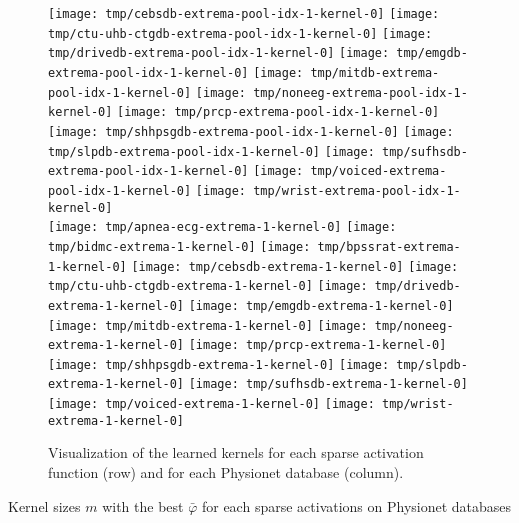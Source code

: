 \documentclass[journal]{IEEEtran}
\begin{document}
\begin{figure*}[!t]
	\texttt{[image: tmp/cebsdb-extrema-pool-idx-1-kernel-0]}
	\texttt{[image: tmp/ctu-uhb-ctgdb-extrema-pool-idx-1-kernel-0]}
	\texttt{[image: tmp/drivedb-extrema-pool-idx-1-kernel-0]}
	\texttt{[image: tmp/emgdb-extrema-pool-idx-1-kernel-0]}
	\texttt{[image: tmp/mitdb-extrema-pool-idx-1-kernel-0]}
	\texttt{[image: tmp/noneeg-extrema-pool-idx-1-kernel-0]}
	\texttt{[image: tmp/prcp-extrema-pool-idx-1-kernel-0]}
	\texttt{[image: tmp/shhpsgdb-extrema-pool-idx-1-kernel-0]}
	\texttt{[image: tmp/slpdb-extrema-pool-idx-1-kernel-0]}
	\texttt{[image: tmp/sufhsdb-extrema-pool-idx-1-kernel-0]}
	\texttt{[image: tmp/voiced-extrema-pool-idx-1-kernel-0]}
	\texttt{[image: tmp/wrist-extrema-pool-idx-1-kernel-0]}
	\\
	\texttt{[image: tmp/apnea-ecg-extrema-1-kernel-0]}
	\texttt{[image: tmp/bidmc-extrema-1-kernel-0]}
	\texttt{[image: tmp/bpssrat-extrema-1-kernel-0]}
	\texttt{[image: tmp/cebsdb-extrema-1-kernel-0]}
	\texttt{[image: tmp/ctu-uhb-ctgdb-extrema-1-kernel-0]}
	\texttt{[image: tmp/drivedb-extrema-1-kernel-0]}
	\texttt{[image: tmp/emgdb-extrema-1-kernel-0]}
	\texttt{[image: tmp/mitdb-extrema-1-kernel-0]}
	\texttt{[image: tmp/noneeg-extrema-1-kernel-0]}
	\texttt{[image: tmp/prcp-extrema-1-kernel-0]}
	\texttt{[image: tmp/shhpsgdb-extrema-1-kernel-0]}
	\texttt{[image: tmp/slpdb-extrema-1-kernel-0]}
	\texttt{[image: tmp/sufhsdb-extrema-1-kernel-0]}
	\texttt{[image: tmp/voiced-extrema-1-kernel-0]}
	\texttt{[image: tmp/wrist-extrema-1-kernel-0]}
	\caption{Visualization of the learned kernels for each sparse activation function (row) and for each Physionet database (column).
	}
	\label{fig:kernelvisualization}
\end{figure*}

\begin{table*}[!t]
	\centering
	\caption{Kernel sizes $m$ with the best $\bar\varphi$ for each sparse activations on Physionet databases}
	\label{table:crrl}
	\setlength\tabcolsep{4pt}
	
\end{table*}
\end{document}
